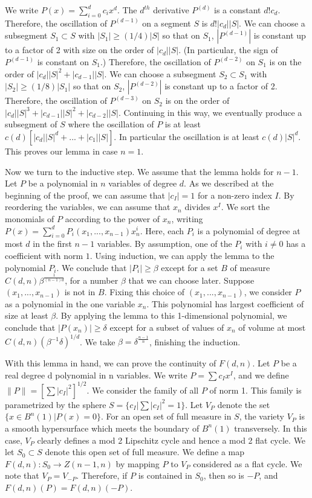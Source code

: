 \documentclass{amsart}
\newtheorem*{Theorem 1}{Theorem 1}
\newtheorem*{Theorem 2}{Theorem 2}
\newtheorem*{Theorem 1A}{Theorem 1A}
\newtheorem*{Theorem 2A}{Theorem 2A}
\newtheorem*{vanishing lemma}{Vanishing Lemma}
\numberwithin{equation}{section}
\begin{document}
We write $P(x) = \sum_{i=0}^d c_i x^d$.  The $d^{th}$ derivative
$P^{(d)}$ is a constant $d! c_d$.  Therefore, the oscillation of
$P^{(d-1)}$ on a segment $S$ is $d! |c_d| |S|$.  We can choose a
subsegment $S_1 \subset S$ with $|S_1| \ge (1/4) |S|$ so that on
$S_1$, $|P^{(d-1)}|$ is constant up to a factor of 2 with size on
the order of $|c_d| |S|$.  (In particular, the sign of
$P^{(d-1)}$ is constant on $S_1$.)  Therefore, the oscillation of
$P^{(d-2)}$ on $S_1$ is on the order of $|c_d| |S|^2 + |c_{d-1}|
|S|$. We can choose a subsegment $S_2 \subset S_1$ with $|S_2|
\ge (1/8) |S_1|$ so that on $S_2$, $|P^{(d-2)}|$ is constant up
to a factor of 2.  Therefore, the oscillation of $P^{(d-3)}$ on
$S_2$ is on the order of $|c_d| |S|^3 + |c_{d-1}| |S|^2 +
|c_{d-2}| |S|$.  Continuing in this way, we eventually produce a
subsegment of $S$ where the oscillation of $P$ is at least $c(d)
[|c_d| |S|^d + ... + |c_1| |S|]$.  In particular the oscillation
is at least $c(d) |S|^d$. This proves our lemma in case $n=1$.

Now we turn to the inductive step.  We assume that the lemma
holds for $n-1$. Let $P$ be a polynomial in $n$ variables of
degree $d$.  As we described at the beginning of the proof, we
can assume that $|c_I| = 1$ for a non-zero index $I$.  By
reordering the variables, we can assume that $x_n$ divides $x^I$.
We sort the monomials of $P$ according to the power of $x_n$,
writing $P(x) = \sum_{i=0}^d P_i(x_1, ..., x_{n-1}) x_n^i$. 
Here, each $P_i$ is a polynomial of degree at most $d$ in the
first $n-1$ variables.  By assumption, one of the $P_i$ with $i
\not= 0$ has a coefficient with norm $1$.  Using induction, we
can apply the lemma to the polynomial $P_i$.  We conclude that
$|P_i| \ge \beta$ except for a set $B$ of measure $C(d,n)
\beta^{\frac{1}{(n-1) d}}$, for a number $\beta$ that we can
choose later. Suppose $(x_1, ..., x_{n-1})$ is not in $B$. 
Fixing this choice of $(x_1, ..., x_{n-1})$, we consider $P$ as a
polynomial in the one variable $x_n$.  This polynomial has
largest coefficient of size at least $\beta$.  By applying the
lemma to this 1-dimensional polynomial, we conclude that
$|P(x_n)| \ge \delta$ except for a subset of values of $x_n$ of
volume at most $C(d,n) (\beta^{-1} \delta)^{1/d}$.  We take
$\beta = \delta^{\frac{n-1}{n}}$, finishing the induction.
\endproof

With this lemma in hand, we can prove the continuity of $F(d,n)$.
Let $P$ be a real degree d polynomial in n variables.  We write
$P = \sum c_I x^I$, and we define $\| P \| = [\sum
|c_I|^2]^{1/2}$.  We consider the family of all $P$ of norm 1. 
This family is parametrized by the sphere $S = \{ c_I | \sum
|c_I|^2 = 1 \}$.  Let $V_P$ denote the set $\{ x \in B^n(1) |
P(x) = 0\}$.  For an open set of full measure in $S$, the variety
$V_P$ is a smooth hypersurface which meets the boundary of $B^n(1)$
transversely.  In this case, $V_P$ clearly defines a mod 2
Lipschitz cycle and hence a mod 2 flat cycle. We let $S_0 \subset
S$ denote this open set of full measure.  We define a map
$F(d,n): S_0 \rightarrow Z(n-1,n)$ by mapping $P$ to $V_P$
considered as a flat cycle.  We note that $V_P = V_{-P}$. 
Therefore, if $P$ is contained in $S_0$, then so is $-P$, and
$F(d,n)(P) = F(d,n)(-P)$.
\end{document}
